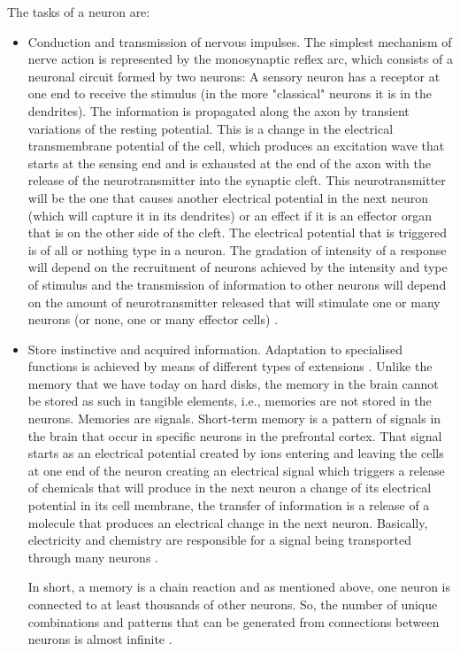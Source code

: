 The tasks of a neuron are:
\begin{itemize}
\item Conduction and transmission of nervous impulses. The simplest mechanism of nerve action is represented by the monosynaptic reflex arc, which consists of a neuronal circuit formed by two neurons: A sensory neuron has a receptor at one end to receive the stimulus (in the more "classical" neurons it is in the dendrites). The information is propagated along the axon by transient variations of the resting potential. This is a change in the electrical transmembrane potential of the cell, which produces an excitation wave that starts at the sensing end and is exhausted at the end of the axon with the release of the neurotransmitter into the synaptic cleft. This neurotransmitter will be the one that causes another electrical potential in the next neuron (which will capture it in its dendrites) or an effect if it is an effector organ that is on the other side of the cleft. The electrical potential that is triggered is of all or nothing type in a neuron. The gradation of intensity of a response will depend on the recruitment of neurons achieved by the intensity and type of stimulus and the transmission of information to other neurons will depend on the amount of neurotransmitter released that will stimulate one or many neurons (or none, one or many effector cells) \cite{noback}.

\item Store instinctive and acquired information. Adaptation to specialised functions is achieved by means of different types of extensions \cite{noback}. Unlike the memory that we have today on hard disks, the memory in the brain cannot be stored as such in tangible elements, i.e., memories are not stored in the neurons. Memories are signals. Short-term memory is a pattern of signals in the brain that occur in specific neurons in the prefrontal cortex. That signal starts as an electrical potential created by ions entering and leaving the cells at one end of the neuron creating an electrical signal which triggers a release of chemicals that will produce in the next neuron a change of its electrical potential in its cell membrane, the transfer of information is a release of a molecule that produces an electrical change in the next neuron. Basically, electricity and chemistry are responsible for a signal being transported through many neurons \cite{brainmemory}.
\newline

In short, a memory is a chain reaction and as mentioned above, one neuron is connected to at least thousands of other neurons. So, the number of unique combinations and patterns that can be generated from connections between neurons is almost infinite \cite{brainmemory}.
\newline


\end{itemize}
